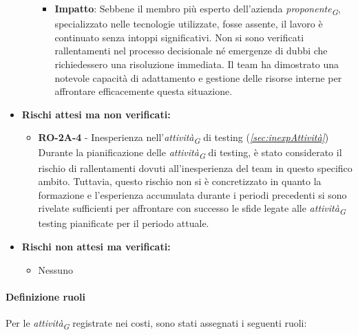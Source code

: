 \begin{itemize}
\begin{itemize}
\begin{itemize}
                    \item \textbf{Impatto}: 
                    Sebbene il membro più esperto dell'azienda \textit{proponente}\textsubscript{\textit{G}}, specializzato nelle tecnologie utilizzate, fosse assente, il lavoro è continuato senza intoppi significativi. Non si sono verificati rallentamenti nel processo decisionale né emergenze di dubbi che richiedessero una risoluzione immediata. Il team ha dimostrato una notevole capacità di adattamento e gestione delle risorse interne per affrontare efficacemente questa situazione.
                \end{itemize}
        \end{itemize}
    \item \textbf{Rischi attesi ma non verificati:} 
        \begin{itemize}
            \item \textbf{RO-2A-4} - Inesperienza nell'\textit{attività}\textsubscript{\textit{G}} di testing (\textit{\ref{sec:inexpAttività}}) \\
            Durante la pianificazione delle \textit{attività}\textsubscript{\textit{G}} di testing, è stato considerato il rischio di rallentamenti dovuti all'inesperienza del team in questo specifico ambito. Tuttavia, questo rischio non si è concretizzato in quanto la formazione e l'esperienza accumulata durante i periodi precedenti si sono rivelate sufficienti per affrontare con successo le sfide legate alle \textit{attività}\textsubscript{\textit{G}} testing pianificate per il periodo attuale.
        \end{itemize}
    \item \textbf{Rischi non attesi ma verificati:}
        \begin{itemize}
            \item Nessuno
        \end{itemize}
\end{itemize}


\paragraph{Definizione ruoli}
Per le \textit{attività}\textsubscript{\textit{G}} registrate nei costi, sono stati assegnati i seguenti ruoli: 

